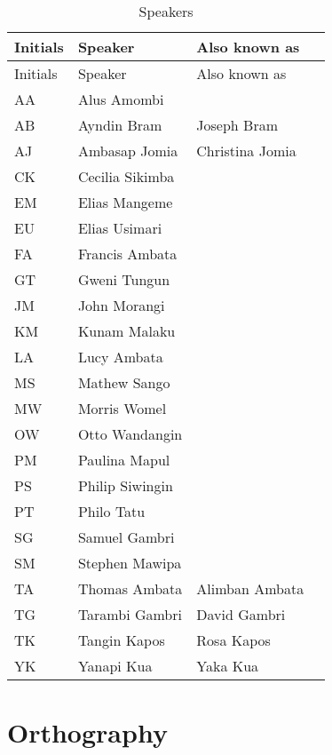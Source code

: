 \begin{xltabular}{\textwidth}{lllQ}
\caption{\label{tab:speakers} Speakers}\\
\lsptoprule
		Initials & Speaker & Also known as\\
		\midrule\endfirsthead
    \midrule
    Initials & Speaker & Also known as\\
		\midrule\endhead
    \midrule\endfoot
    \lspbottomrule
    \endlastfoot

AA & Alus Amombi & {}\\
AB & Ayndin Bram & {Joseph Bram}\\
AJ & Ambasap Jomia & {Christina Jomia}\\
CK & Cecilia Sikimba & {}\\
EM & Elias Mangeme & {}\\
EU & Elias Usimari & {}\\
FA & Francis Ambata & {}\\
GT & Gweni Tungun & {}\\
JM & John Morangi & {}\\
KM & Kunam Malaku & {}\\
LA & Lucy Ambata & {}\\
MS & Mathew Sango & {}\\
MW & Morris Womel & {}\\
OW & Otto Wandangin & {}\\
PM & Paulina Mapul & {}\\
PS & Philip Siwingin & {}\\
PT & Philo Tatu & {}\\
SG & Samuel Gambri & {}\\
SM & Stephen Mawipa & {}\\
TA & Thomas Ambata & {Alimban Ambata}\\
TG & Tarambi Gambri & {David Gambri}\\
TK & Tangin Kapos & {Rosa Kapos}\\
YK & Yanapi Kua & {Yaka Kua}\\
\end{xltabular}

\section{Orthography}\label{sec:1.4}


